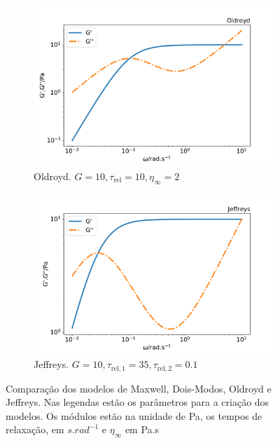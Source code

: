 \begin{figure}[H]
				\begin{subfigure}[t]{.5\textwidth}
					\centering
					\includegraphics[width=\textwidth]{./imagens/reologia/modelos_comparativo_oldroyd}
					\caption{Oldroyd. \(G=10, \tau_{\mathrm{rel}}=10, \eta_{\infty}=2\)}
					\label{fig:comparativo_modelo_oldroyd}
				\end{subfigure}%
				\begin{subfigure}[t]{.5\textwidth}
					\centering
					\includegraphics[width=\textwidth]{./imagens/reologia/modelos_comparativo_jeffreys}
					\caption{Jeffreys. \(G=10, \tau_{\mathrm{rel,1}}=35, \tau_{\mathrm{rel,2}}=0.1 \)}
					\label{fig:comparativo_modelo_jeffreys}
				\end{subfigure}
			
				\caption{Comparação dos modelos de Maxwell, Dois-Modos, Oldroyd e Jeffreys. Nas legendas estão os parâmetros para a criação dos modelos. Os módulos estão na unidade de Pa, os tempos de relaxação, em \(s.rad^{-1}\) e \(\eta_{\infty}\) em Pa.s}
				\label{fig:comparativo_modelos}
			\end{figure}
			

